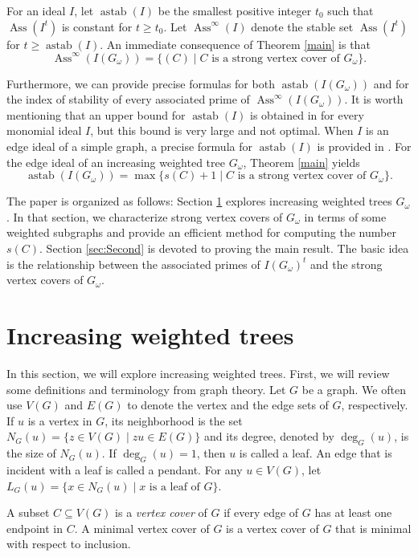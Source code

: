 \documentclass[12pt,amscd]{amsart}
\DeclareMathOperator{\ass}{Ass}
\DeclareMathOperator{\astab}{astab}
\theoremstyle{definition}
\begin{document}
\medskip
For an ideal $I$, let $\astab(I)$ be the  smallest  positive integer $t_0$ such that $\ass(I^t)$ is constant for $t\geqslant t_0$. Let $\ass^\infty(I)$ denote the stable set $\ass(I^t)$ for $t\geqslant \astab(I)$. An immediate consequence of Theorem \ref{main} is that $$\ass^\infty(I(G_\omega)) = \{(C) \mid C \text{ is a strong vertex cover of } G_\omega\}.$$

Furthermore, we can provide precise formulas for both $\astab(I(G_\omega))$ and  for the index of stability of every associated prime of $\ass^\infty(I(G_\omega))$. It is worth mentioning that an upper bound for $\astab(I)$ is obtained in \cite{H} for every monomial ideal $I$, but this
bound is very large and not optimal. When $I$ is an edge ideal of a simple graph, a precise formula for $\astab(I)$ is provided in \cite{LT}. For the edge ideal of an increasing weighted tree $G_\omega$,  Theorem \ref{main} yields
$$\astab(I(G_\omega)) = \max\{s(C)+1\mid C \text{ is a strong vertex cover of } G_\omega\}.$$

The paper is organized as  follows:   Section \ref{sec:prelim} explores increasing weighted trees $G_\omega$.  In that section,  we characterize strong vertex covers of $G_\omega$ in terms of some weighted subgraphs and provide an efficient method for computing the number $s(C)$. Section \ref{sec:Second}  is devoted to proving the main result. The basic idea is the relationship between the associated primes of $I(G_\omega)^t$ and the strong vertex covers of $G_\omega$.

\section{Increasing weighted trees}
\label{sec:prelim}

In this section, we will explore increasing weighted trees. First, we will review some definitions and terminology from graph theory. Let $G$ be a graph. We often use  $V(G)$ and $E(G)$ to denote the vertex and the edge sets of $G$, respectively. If $u$ is a vertex in $G$, its neighborhood is the set  $N_G(u)=\{z \in V(G)\mid  zu\in E(G)\}$ and its degree, denoted by $\deg_{G}(u)$, is the size of $N_G(u)$.
If $\deg_G(u) = 1$, then $u$ is called a leaf. An edge that is incident with a leaf is called a pendant.  For any  $u\in V(G)$, let $L_G(u) = \{x\in N_G(u)\mid x \text{ is a leaf of } G\}$.

A subset $C \subseteq V(G)$ is a  {\it vertex cover}  of $G$ if every edge of $G$ has at least one endpoint in $C$. A minimal vertex cover  of $G$ is a vertex cover  of $G$ that is minimal with respect to inclusion.
 
\end{document}
